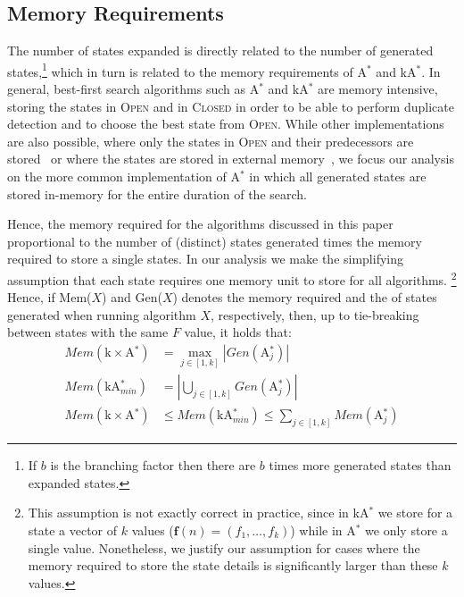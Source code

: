 \documentclass{aicom2e}
\newcommand{\astar}{A$^*$}
\newcommand{\kastar}{kA$^*$}
\newcommand{\kastarmin}{kA$^*_{min}$}
\newcommand{\kxastar}{k$\times$A$^*$}
\newcommand{\astari}[1]{A$^*_#1$}
\newcommand{\open}{\textsc{Open}}
\newcommand{\closed}{\textsc{Closed}}
\begin{document}
\subsection{Memory Requirements}
The number of states expanded is directly related to the number of generated
states,\footnote{If $b$ is the branching factor then there are $b$ times more
    generated states than expanded states.} which in turn is related to the memory
requirements of \astar{} and \kastar{}. In general, best-first search
algorithms such as \astar{} and \kastar{} are memory intensive, storing the
states in \open{} and in \closed{} in order to be able to perform duplicate
detection and to choose the best state from \open{}. While other
implementations are also possible, where only the states in \open{} and their
predecessors are stored~\cite{zhou2006breadth,korf2004best} or where the states
are stored in external
memory~\cite{zhou2004structured,edelkamp2016external,edelkamp2005external}, we
focus our analysis on the more common implementation of \astar{} in which all
generated states are stored in-memory for the entire duration of the search.

Hence, the memory required for the algorithms discussed in this paper
proportional to the number of (distinct) states generated times the memory
required to store a single states.
In our analysis we make the simplifying assumption that each state requires one
memory unit to store for all algorithms. \footnote{This assumption is not
exactly correct in practice, since in \kastar{} we store for a state a vector
of $k$ values ($\textbf{f}(n)=(f_1,\ldots,f_k)$)  while in \astar{} we only
store a single value. Nonetheless, we justify our assumption for cases where
the memory required to store the state details is significantly larger than
these $k$ values.} Hence, if Mem($X$) and Gen($X$) denotes the memory required
and the of states generated when running algorithm $X$, respectively, then, up to tie-breaking between states with the same $F$ value, it holds that:
\begin{align}
Mem(\text{\kxastar{}})&=\max_{j\in [1,k]}| Gen(\text{\astari{j}})| \label{eq:kxastar-mem}\\
Mem(\text{\kastarmin{}})&=|\bigcup_{j\in [1,k]} Gen(\text{\astari{j}})| \label{eq:kastar-mem}\\
Mem(\text{\kxastar{}})&\leq Mem(\text{\kastarmin{}}) \leq \sum_{j\in[1,k]} Mem(\text{\astari{j}}) \label{eq:kxastar-kastar-mem}
\end{align}
\end{document}
